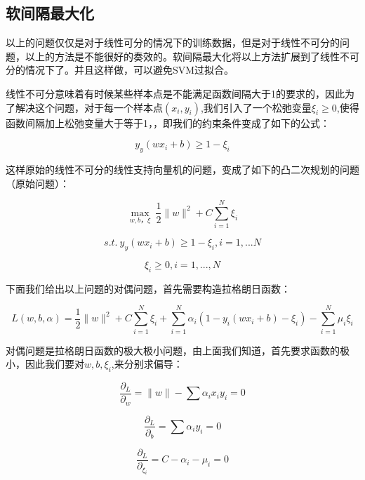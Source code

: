	\subsection{软间隔最大化}
	以上的问题仅仅是对于线性可分的情况下的训练数据，但是对于线性不可分的问题，以上的方法是不能很好的奏效的。软间隔最大化将以上方法扩展到了线性不可分的情况下了。并且这样做，可以避免SVM过拟合。
	
	线性不可分意味着有时候某些样本点是不能满足函数间隔大于1的要求的，因此为了解决这个问题，对于每一个样本点$(x_i,y_i)$,我们引入了一个松弛变量$\xi_i \geq 0$,使得函数间隔加上松弛变量大于等于1，，即我们的约束条件变成了如下的公式：
	
	\begin{equation}
	y_y(wx_i+b) \geq 1-\xi_i
	\end{equation}
	
	这样原始的线性不可分的线性支持向量机的问题，变成了如下的凸二次规划的问题（原始问题）：
	
	\begin{equation}
		\max_{w,b，\xi}\ \frac{1}{2}\|w\|^2 +C\sum_{i=1}^{N}\xi_i
	\end{equation}
	
	\begin{equation}
		s.t.\ y_y(wx_i+b) \geq 1-\xi_i, i=1,...N
	\end{equation}
	
	\begin{equation}
		\xi_i \geq 0, i=1,...,N
	\end{equation}
	
	下面我们给出以上问题的对偶问题，首先需要构造拉格朗日函数：
	
	\begin{equation}
	L(w,b,\alpha) = \frac{1}{2}\|w\|^2 +C\sum_{i=1}^{N}\xi_i +\sum_{i=1}^{N}\alpha_i(1-y_i(wx_i+b)-\xi_i) - \sum_{i=1}^{N}\mu_i\xi_i
	\end{equation}
	
	对偶问题是拉格朗日函数的极大极小问题，由上面我们知道，首先要求函数的极小，因此我们要对$w,b,\xi_i$,来分别求偏导：
	
	\begin{equation}
		\frac{\partial_L}{\partial_w}=\|w\| - \sum \alpha_i x_i y_i = 0
	\end{equation}

	\begin{equation}
		\frac{\partial_L}{\partial_b}=\sum \alpha_i y_i = 0
	\end{equation}
	
	\begin{equation}
		\frac{\partial_L}{\partial_{\xi_i}}= C-\alpha_i - \mu_i = 0
	\end{equation}
	
